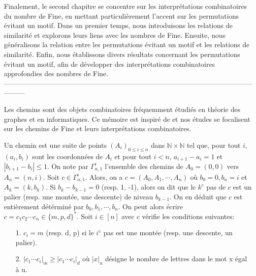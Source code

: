 Finalement, le second chapitre se concentre sur les interprétations combinatoires du nombre de Fine, en mettant particulièrement l'accent sur les permutations évitant un motif. Dans un premier temps, nous introduisons les relations de similarité et explorons leurs liens avec les nombres de Fine. Ensuite, nous généralisons la relation entre les permutations évitant un motif et les relations de similarité. Enfin, nous établissons divers résultats concernant les permutations évitant un motif, afin de développer des interprétations combinatoires approfondies des nombres de Fine.\\
---------------------------------------------------------------------------------------------------------------------\\
\newpage

Les chemins sont des objets combinatoires fréquemment étudiés en théorie des graphes et en informatiques. Ce mémoire est
inspiré de \cite{RRP} et nos études se focalisent sur les chemins de Fine et leurs interprétations combinatoires.

Un chemin est une suite de points $(A_{i})_{0 \leq i \leq n}$ dans $\mathbb{N}\times \mathbb{N}$ tel que, pour tout $i$, $
	(a_{i}, b_{i})$ sont les coordonnées de $A_{i}$ et pour tout $i<n$, $a_{i+1} - a_{i}=1$ et $|b_{i+1} - b_{i}| \leq 1$.
On note par $\Gamma_{n,1}^{i}$ l'ensemble des chemins de $A_{0} = (0,0)$ vers $A_{n} = (n,i)$.
Soit $c \in \Gamma_{n,1}^{i}$. Alors, on a $c = (A_{0},A_{1}, \cdots, A_{n})$ où $b_{0}=0, b_{n} = i$ et $A_{k} = (k, b_{k})
$. Si $b_{k} - b_{k-1} = 0$ (resp. 1, -1), alors on dit que le $k^{e}$ pas de $c$ est un palier (resp. une
montée, une 	descente) de niveau $b_{k-1}$. On en déduit que $c$ est entièrement détérminé par $b_{0}, b_{1}, \cdots, b_{n}$.
On peut alors écrire $c = c_{1}c_{2} \cdots c_{n} \in \{m, p, d\}^{*}$. Soit $i \in [n]$ avec $c$ vérifie les conditions
suivantes:
\begin{itemize}
	\item[1.] $c_{i} = m$ (resp. d, p) si le $i^{e}$ pas est une montée (resp. une descente, un palier).
	\item[2.] $|c_{1} \cdots c_{i}|_{m} \geq |c_{1} \cdots c_{i}|_{d}$ où $|x|_{u}$ désigne le nombre de
		lettres dans le mot x égal à u.
\end{itemize} \vspace{15pt}


